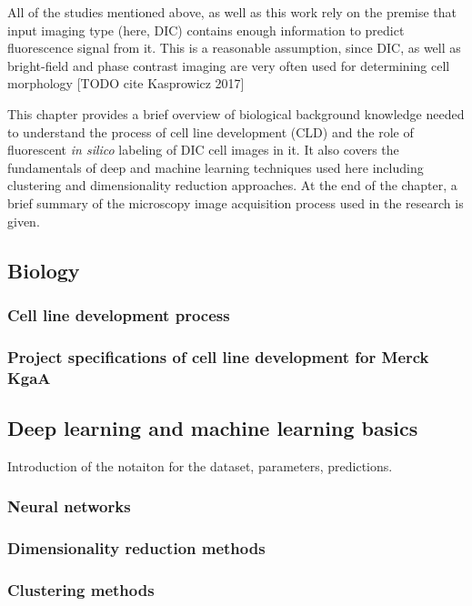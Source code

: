     All of the studies mentioned above, as well as this work rely on the premise that input imaging type (here, DIC) contains enough information to predict fluorescence signal from it. This is a reasonable assumption, since DIC, as well as bright-field and phase contrast imaging are very often used for determining cell morphology [TODO cite Kasprowicz 2017]

    This chapter provides a brief overview of biological background knowledge needed to understand the process of cell line development (CLD) and the role of fluorescent \textit{in silico} labeling of DIC cell images in it. It also covers the fundamentals of deep and machine learning techniques used here including clustering and dimensionality reduction approaches. At the end of the chapter, a brief summary of the microscopy image acquisition process used in the research is given.

    \subsection{Biology}
        \subsubsection{Cell line development process}
        
        \subsubsection{Project specifications of cell line development for Merck KgaA}
        
    \subsection{Deep learning and machine learning basics}
        Introduction of the notaiton for the dataset, parameters, predictions.
        \subsubsection{Neural networks}
            
        \subsubsection{Dimensionality reduction methods}
            
        \subsubsection{Clustering methods}
            
